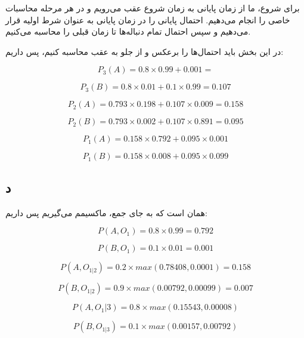 برای شروع، ما از زمان پایانی به زمان شروع عقب می‌رویم و در هر مرحله محاسبات خاصی را انجام می‌دهیم. احتمال پایانی را در زمان پایانی به عنوان شرط اولیه قرار می‌دهیم و سپس احتمال تمام دنباله‌ها تا زمان قبلی را محاسبه می‌کنیم.

در این بخش باید احتمال‌ها را برعکس و از جلو به عقب محاسبه کنیم، پس داریم:

$$
P_3(A) = 0.8 \times 0.99 + 0.001 = 
$$

$$
P_3(B) = 0.8 \times 0.01 + 0.1 \times 0.99 = 0.107
$$

$$
P_2(A) = 0.793 \times 0.198 + 0.107 \times 0.009 = 0.158
$$

$$
P_2(B) = 0.793 \times 0.002 + 0.107 \times 0.891 = 0.095
$$

$$
P_1(A) = 0.158 \times 0.792 + 0.095 \times 0.001
$$

$$
P_1(B) = 0.158 \times 0.008 + 0.095 \times 0.099
$$

\subsection*{د}

همان 
است که به جای جمع، ماکسیمم می‌گیریم پس داریم:

$$
P(A, O_1) = 0.8 \times 0.99 = 0.792
$$

$$
P(B, O_1) = 0.1 \times 0.01 = 0.001
$$

$$
P(A, O_{1 | 2}) = 0.2 \times max(0.78408 , 0.0001) = 0.158
$$

$$
P(B, O_{1 | 2}) = 0.9 \times max(0.00792 , 0.00099) = 0.007	
$$

$$
P(A, O_{1} | 3) = 0.8 \times max(0.15543 , 0.00008)
$$

$$
P(B, O_{1 | 3}) = 0.1 \times max(0.00157 , 0.00792)
$$

